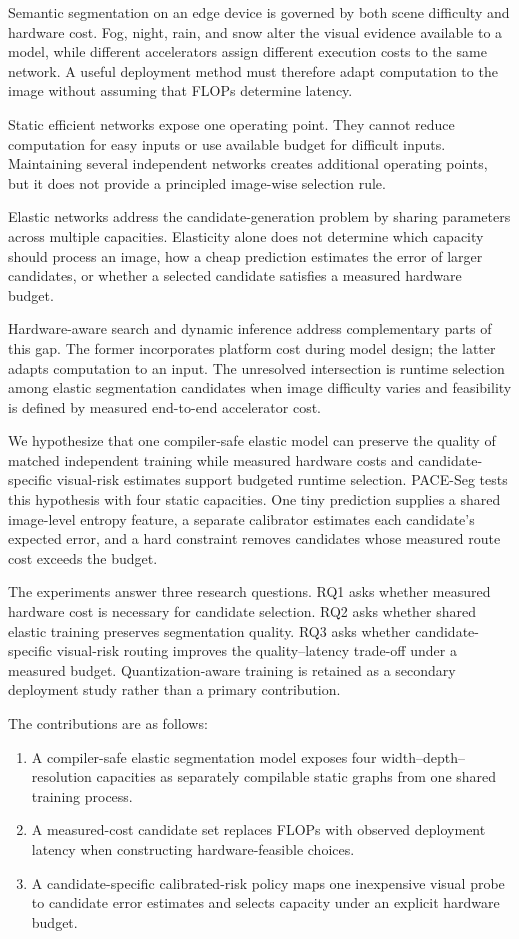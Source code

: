 \documentclass[a4paper,review,12pt]{elsarticle}
\newcommand{\method}{PACE-Seg}
\begin{document}
Semantic segmentation on an edge device is governed by both scene difficulty and hardware cost. Fog, night, rain, and snow alter the visual evidence available to a model, while different accelerators assign different execution costs to the same network. A useful deployment method must therefore adapt computation to the image without assuming that FLOPs determine latency.

Static efficient networks expose one operating point. They cannot reduce computation for easy inputs or use available budget for difficult inputs. Maintaining several independent networks creates additional operating points, but it does not provide a principled image-wise selection rule.

Elastic networks address the candidate-generation problem by sharing parameters across multiple capacities. Elasticity alone does not determine which capacity should process an image, how a cheap prediction estimates the error of larger candidates, or whether a selected candidate satisfies a measured hardware budget.

Hardware-aware search and dynamic inference address complementary parts of this gap. The former incorporates platform cost during model design; the latter adapts computation to an input. The unresolved intersection is runtime selection among elastic segmentation candidates when image difficulty varies and feasibility is defined by measured end-to-end accelerator cost.

We hypothesize that one compiler-safe elastic model can preserve the quality of matched independent training while measured hardware costs and candidate-specific visual-risk estimates support budgeted runtime selection. \method{} tests this hypothesis with four static capacities. One tiny prediction supplies a shared image-level entropy feature, a separate calibrator estimates each candidate's expected error, and a hard constraint removes candidates whose measured route cost exceeds the budget.

The experiments answer three research questions. RQ1 asks whether measured hardware cost is necessary for candidate selection. RQ2 asks whether shared elastic training preserves segmentation quality. RQ3 asks whether candidate-specific visual-risk routing improves the quality--latency trade-off under a measured budget. Quantization-aware training is retained as a secondary deployment study rather than a primary contribution.

The contributions are as follows:
\begin{enumerate}
    \item A compiler-safe elastic segmentation model exposes four width--depth--resolution capacities as separately compilable static graphs from one shared training process.
    \item A measured-cost candidate set replaces FLOPs with observed deployment latency when constructing hardware-feasible choices.
    \item A candidate-specific calibrated-risk policy maps one inexpensive visual probe to candidate error estimates and selects capacity under an explicit hardware budget.
\end{enumerate}
\end{document}

